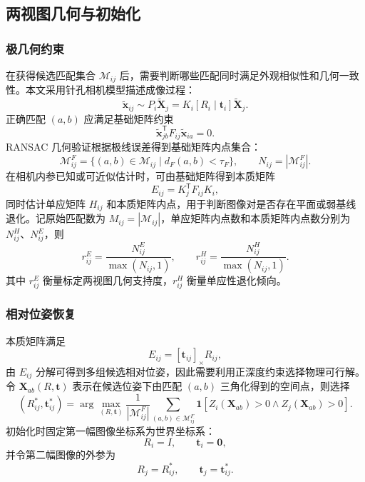 \documentclass[lang=cn,a4paper,newtx]{elegantpaper} %
\begin{document}
\subsection{两视图几何与初始化}
\subsubsection{极几何约束}
在获得候选匹配集合 $\mathcal{M}_{ij}$ 后，需要判断哪些匹配同时满足外观相似性和几何一致性。本文采用针孔相机模型描述成像过程：
\begin{equation}
    \tilde{\mathbf{x}}_{ij}\sim P_i\tilde{\mathbf{X}}_j
    =K_i[R_i\mid\mathbf{t}_i]\tilde{\mathbf{X}}_j .
\end{equation}
正确匹配 $(a,b)$ 应满足基础矩阵约束
\begin{equation}
    \tilde{\mathbf{x}}_{jb}^{\mathsf{T}}F_{ij}\tilde{\mathbf{x}}_{ia}=0 .
\end{equation}
RANSAC 几何验证根据极线误差得到基础矩阵内点集合：
\begin{equation}
    \mathcal{M}_{ij}^{F}
    =
    \{(a,b)\in\mathcal{M}_{ij}\mid d_F(a,b)<\tau_F\},
    \qquad
    N_{ij}=|\mathcal{M}_{ij}^{F}|.
\end{equation}
在相机内参已知或可近似估计时，可由基础矩阵得到本质矩阵
\begin{equation}
    E_{ij}=K_j^{\mathsf{T}}F_{ij}K_i ,
\end{equation}
同时估计单应矩阵 $H_{ij}$ 和本质矩阵内点，用于判断图像对是否存在平面或弱基线退化。记原始匹配数为 $M_{ij}=|\mathcal{M}_{ij}|$，单应矩阵内点数和本质矩阵内点数分别为 $N_{ij}^{H}$、$N_{ij}^{E}$，则
\begin{equation}
    r_{ij}^{E}=\frac{N_{ij}^{E}}{\max(N_{ij},1)},
    \qquad
    r_{ij}^{H}=\frac{N_{ij}^{H}}{\max(N_{ij},1)} .
\end{equation}
其中 $r_{ij}^{E}$ 衡量标定两视图几何支持度，$r_{ij}^{H}$ 衡量单应性退化倾向。

\subsubsection{相对位姿恢复}
本质矩阵满足
\begin{equation}
    E_{ij}=[\mathbf{t}_{ij}]_{\times}R_{ij},
\end{equation}
由 $E_{ij}$ 分解可得到多组候选相对位姿，因此需要利用正深度约束选择物理可行解。令 $\mathbf{X}_{ab}(R,\mathbf{t})$ 表示在候选位姿下由匹配 $(a,b)$ 三角化得到的空间点，则选择
\begin{equation}
    (R_{ij}^{*},\mathbf{t}_{ij}^{*})
    =
    \arg\max_{(R,\mathbf{t})}
    \frac{1}{|\mathcal{M}_{ij}^{F}|}
    \sum_{(a,b)\in\mathcal{M}_{ij}^{F}}
    \mathbf{1}
    \left[
    Z_i(\mathbf{X}_{ab})>0
    \land
    Z_j(\mathbf{X}_{ab})>0
    \right].
\end{equation}
初始化时固定第一幅图像坐标系为世界坐标系：
\begin{equation}
    R_i=I,\qquad \mathbf{t}_i=\mathbf{0},
\end{equation}
并令第二幅图像的外参为
\begin{equation}
    R_j=R_{ij}^{*},\qquad \mathbf{t}_j=\mathbf{t}_{ij}^{*}.
\end{equation}
\end{document}
